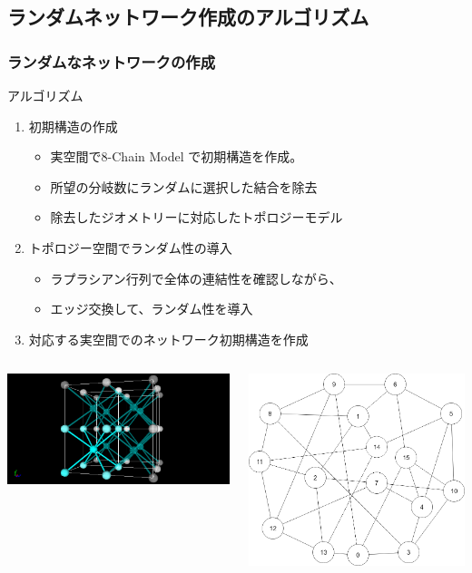 \documentclass[12pt, dvipdfmx]{beamer}
\begin{document}
\subsection{ランダムネットワーク作成のアルゴリズム}
\begin{frame}
	\frametitle{ランダムなネットワークの作成}
		\begin{exampleblock}{アルゴリズム}
			\begin{enumerate}
				\item 初期構造の作成
					\begin{itemize}
						\item \alert{実空間}で8-Chain Model で初期構造を作成。
						\item 所望の分岐数に\alert{ランダム}に選択した\alert{結合を除去}
						\item 除去したジオメトリーに対応した\alert{トポロジーモデル}
					\end{itemize}
				\item トポロジー空間でランダム性の導入
					\begin{itemize}
						\item ラプラシアン行列で全体の連結性を確認しながら、
						\item \alert{エッジ交換}して、ランダム性を導入
					\end{itemize}	
				\item 対応する\alert{実空間でのネットワーク初期構造}を作成
			\end{enumerate}
		\end{exampleblock}
		\begin{columns}[T, onlytextwidth]
				\includegraphics[width=\textwidth]{8_per.png}
				\vspace{-5mm}
				\begin{center}
					\includegraphics[width=.65\textwidth]{Network.png}

\end{center}
\end{columns}
\end{frame}
\end{document}
